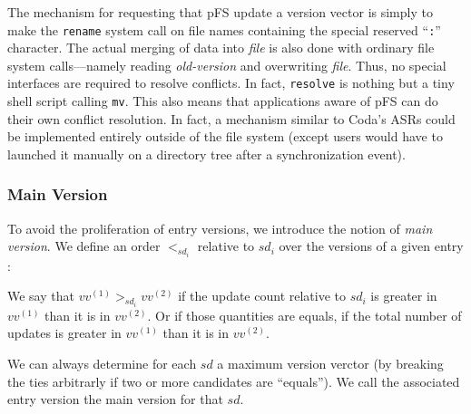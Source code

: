 The mechanism for requesting that pFS update a version vector is
simply to make the {\tt rename} system call on file names containing
the special reserved ``\texttt{:}'' character.  The actual merging of
data into \emph{file} is also done with ordinary file system
calls---namely reading \emph{old-version} and overwriting \emph{file}.
Thus, no special interfaces are required to resolve conflicts.  In
fact, \texttt{resolve} is nothing but a tiny shell script calling
\texttt{mv}.  This also means that applications aware of pFS can do
their own conflict resolution.  In fact, a mechanism similar to Coda's
ASRs could be implemented entirely outside of the file system (except
users would have to launched it manually on a directory tree after a
synchronization event).


\subsubsection{Main Version}

To avoid the proliferation of entry versions, we introduce the notion
of \emph{main version}. We define an order $<_{sd_{i}}$ relative to
$sd_{i}$ over the versions of a given entry :

\begin{definition}
We say that $vv^{(1)} >_{sd_{i}} vv^{(2)}$ if the update count
relative to $sd_{i}$ is greater in $vv^{(1)}$ than it is in
$vv^{(2)}$. Or if those quantities are equals, if the total number
of updates is greater in $vv^{(1)}$ than it is in $vv^{(2)}$.
\end{definition}
 
We can always determine for each $sd$ a maximum version verctor (by
breaking the ties arbitrarly if two or more candidates are
``equals''). We call the associated entry version the main version for
that $sd$.

